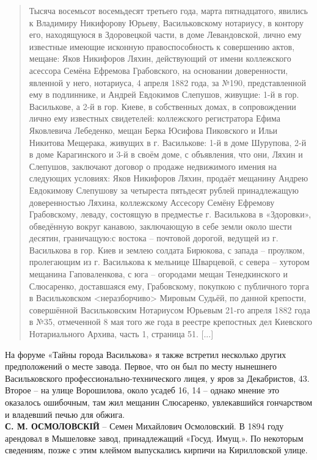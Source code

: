 \begin{quotation}
Тысяча восемьсот восемьдесят третьего года, марта пятнадцатого, явились к Владимиру Никифорову Юрьеву, Васильковскому нотариусу, в контору его, находящуюся в Здоровецкой части, в доме Левандовской, лично ему известные имеющие исконную правоспособность к совершению актов, мещане: Яков Никифоров Ляхин, действующий от имени коллежского асессора Семёна Ефремова Грабовского, на основании доверенности, явленной у него, нотариуса, 4 апреля 1882 года, за №190, представленной ему в подлиннике, и Андрей Евдокимов Слепушов, живущие: 1-й в гор. Василькове, а 2-й в гор. Киеве, в собственных домах, в сопровождении лично ему известных свидетелей: коллежского регистратора Ефима Яковлевича Лебеденко, мещан Берка Юсифова Пиковского и Ильи Никитова Мещерака, живущих в г. Василькове: 1-й в доме Шурупова, 2-й в доме Карагинского и 3-й в своём доме, с объявления, что они, Ляхин и Слепушов, заключают договор о продаже недвижимого имения на следующих условиях: Яков Никифоров Ляхин, продаёт мещанину Андрею Евдокимову Слепушову за четыреста пятьдесят рублей принадлежащую доверенностью Ляхина, коллежскому Ассесору Семёну Ефремову Грабовскому, леваду, состоящую в предместье г. Василькова в «Здоровки», обведённую вокруг канавою, заключающую в себе земли около шести десятин, граничащую:с востока – почтовой дорогой, ведущей из г. Василькова в гор. Киев и землею солдата Бирюкова, с запада – проулком, пролегающим из г. Василькова к мельнице Шварцевой, с севера – хутором мещанина Гаповаленкова, с юга – огородами мещан Тенедкинского и Слюсаренко, доставшаяся ему, Грабовскому, покупкою с публичного торга в Васильковском <неразборчиво> Мировым Судьёй, по данной крепости, совершённой Васильковским Нотариусом Юрьевым 21-го апреля 1882 года в №35, отмеченной 8 мая того же года в реестре крепостных дел Киевского Нотариального Архива, часть 1, страница 51. [...]
\end{quotation}

На форуме «Тайны города Василькова» я также встретил несколько других предположений о месте завода. Первое, что он был по месту нынешнего Васильковского профессионально-технического лицея, у яров за Декабристов, 43. Второе – на улице Ворошилова, около усадеб 16, 14 – однако мнение это оказалось ошибочным, там жил мещанин Слюсаренко, увлекавшийся гончарством и владевший печью для обжига.\\

\noindent\textbf{С. М. ОСМОЛОВСКІЙ} – Семен Михайлович Осмоловский. В 1894 году арендовал в Мышеловке завод, принадлежащий «Госуд. Имущ.». По некоторым сведениям, позже с этим клеймом выпускались кирпичи на Кирилловской улице.\\

